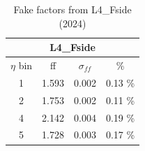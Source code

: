 \begin{minipage}[t]{\textwidth}
\begin{minipage}[t]{0.32\textwidth}
    \begin{table}[H]
      \centering
      \begin{tabular}{|c|c|c|c|}
        \hline
        \multicolumn{4}{|c|}{\textbf{L4\_Fside}} \\
        \hline
        $\eta$ bin & ff & $\sigma_{ff}$ & \% \\
        \hline
        1 & 1.593 & 0.002 & 0.13 \% \\
        \hline
        2 & 1.753 & 0.002 & 0.11 \% \\
        \hline
        4 & 2.142 & 0.004 & 0.19 \% \\
        \hline
        5 & 1.728 & 0.003 & 0.17 \% \\
        \hline
      \end{tabular}
      \caption{Fake factors from L4\_Fside (2024)}
    \end{table}
  \end{minipage}
  

\end{minipage}
